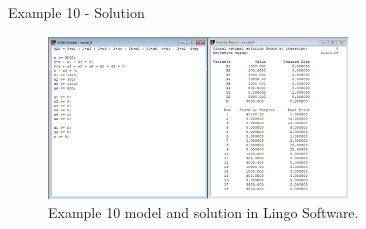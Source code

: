 \begin{frame}{Example 10 - Solution}
\begin{figure}
    \includegraphics[width=300px]{slides/ex10/screenshot.png}
    \caption{Example 10 model and solution in Lingo Software.}
\end{figure}
\end{frame}
